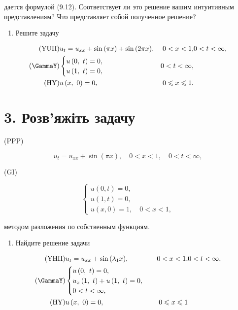 \documentclass[
]{article}
\providecommand{\tightlist}{%
  \setlength{\itemsep}{0pt}\setlength{\parskip}{0pt}}
\begin{document}
дается формулой (9.12). Соответствует ли это решение вашим интуитивным
представлениям? Что представляет собой полученное решение?

\begin{enumerate}
\def\labelenumi{\arabic{enumi}.}
\setcounter{enumi}{1}
\tightlist
\item
  Решите задачу
\end{enumerate}

\[
\begin{aligned} (\text{YUII}) & u_t = u_{xx} + \sin{(\pi x)} + \sin{(2\pi x)}, & 0 < x < 1, & 0 <t < \infty, \\ (\text{\GammaY}) & \begin{cases} u\left(0,\ t\right) = 0, \\ u\left(1,\ t\right) = 0, \end{cases} & 0 < t < \infty, \\ (\text{HY}) & u\left(x,\ 0\right) = 0, & 0 \leqslant x \leqslant 1. \end{aligned}
\]

\section{3. Розв'яжіть
задачу}\label{ux440ux43eux437ux432ux44fux436ux456ux442ux44c-ux437ux430ux434ux430ux447ux443}

(PPP)

\[
u_t = u_{xx} + \sin(\pi x), \quad 0 < x < 1, \quad 0 < t < \infty,
\]

(GI)

\[
\begin{cases} u(0, t) = 0, \\ u(1, t) = 0, \\ u(x, 0) = 1, \quad 0 < x < 1, \end{cases}
\]

методом разложения по собственным функциям.

\begin{enumerate}
\def\labelenumi{\arabic{enumi}.}
\setcounter{enumi}{3}
\tightlist
\item
  Найдите решение задачи
\end{enumerate}

\[
\begin{aligned} (\text{YHII}) & u_t = u_{xx} + \sin{(\lambda_1 x)}, & 0 < x < 1, & 0 <t < \infty, \\ (\text{\GammaY}) & \begin{cases} u\left(0, \ t\right) = 0, \\ u_x\left(1, \ t\right) + u\left(1, \ t\right) = 0, \\ 0 < t < \infty, \end{cases} \\ (\text{HY}) & u\left(x, \ 0\right) = 0, & 0 \leqslant x \leqslant 1 \end{aligned}
\]
\end{document}
